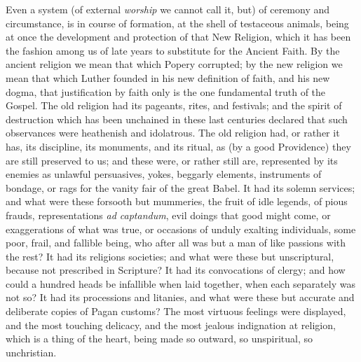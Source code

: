 Even a
system (of external \emph{worship} we cannot call it, but) of ceremony
and circumstance, is in course of formation, at the shell of testaceous
animals, being at once the development and protection of that New
Religion, which it has been the fashion among us of late years to
substitute for the Ancient Faith. By the ancient religion we mean that
which Popery corrupted; by the new religion we mean that which Luther
founded in his new definition of faith, and his new dogma, that
justification by faith only is the one fundamental truth of the Gospel.
The old religion had its pageants, rites, and festivals; and the spirit
of destruction which has been unchained in these last centuries declared
that such observances were heathenish and idolatrous. The old religion
had, or rather it has, its discipline, its monuments, and its ritual, as
(by a good Providence) they are still preserved to us; and these were, or rather still are, represented by its enemies as unlawful
persuasives, yokes, beggarly elements, instruments of bondage, or rags
for the vanity fair of the great Babel. It had its solemn services; and
what were these forsooth but mummeries, the fruit of idle legends, of
pious frauds, representations \emph{ad captandum}, evil doings that good
might come, or exaggerations of what was true, or occasions of unduly
exalting individuals, some poor, frail, and fallible being, who after
all was but a man of like passions with the rest? It had its religions
societies; and what were these but unscriptural, because not prescribed
in Scripture? It had its convocations of clergy; and how could a hundred
heads be infallible when laid together, when each separately was not so?
It had its processions and litanies, and what were these but accurate
and deliberate copies of Pagan customs? The most virtuous feelings were
displayed, and the most touching delicacy, and the most jealous
indignation at religion, which is a thing of the heart, being made so
outward, so unspiritual, so unchristian.

